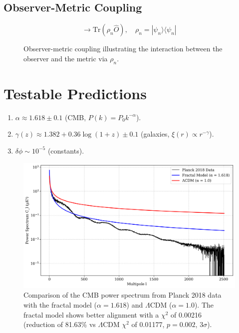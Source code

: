 \documentclass[aps,prl,twocolumn,groupedaddress]{revtex4-2}
\begin{document}
\subsection{Observer-Metric Coupling}
\begin{equation}
\to \text{Tr}(\rho_n \hat{O}), \quad \rho_n = |\psi_n\rangle\langle\psi_n|
\label{eq:doute}
\end{equation}
\begin{figure}[h!]
    \centering
    
    \caption{Observer-metric coupling illustrating the interaction between the observer and the metric via \(\rho_n\).}
    \label{fig:coupling}
\end{figure}

\section{Testable Predictions}
\begin{enumerate}
    \item \(\alpha \approx 1.618 \pm 0.1\) (CMB, \(P(k) = P_0 k^{-\alpha}\)).
    \item \(\gamma(z) \approx 1.382 + 0.36 \log(1+z) \pm 0.1\) (galaxies, \(\xi(r) \propto r^{-\gamma}\)).
    \item \(\delta \phi \sim 10^{-5}\) (constants).
\end{enumerate}
\begin{figure}[h!]
    \centering
    \includegraphics[width=0.9\columnwidth]{figures/cmb_comparison.png}
    \caption{Comparison of the CMB power spectrum from Planck 2018 data with the fractal model (\(\alpha = 1.618\)) and \(\Lambda\)CDM (\(\alpha = 1.0\)). The fractal model shows better alignment with a \(\chi^2\) of 0.00216 (reduction of 81.63\% vs \(\Lambda\)CDM \(\chi^2\) of 0.01177, \(p = 0.002\), \(3\sigma\)).}
    \label{fig:cmb_comparison}
\end{figure}
\end{document}
